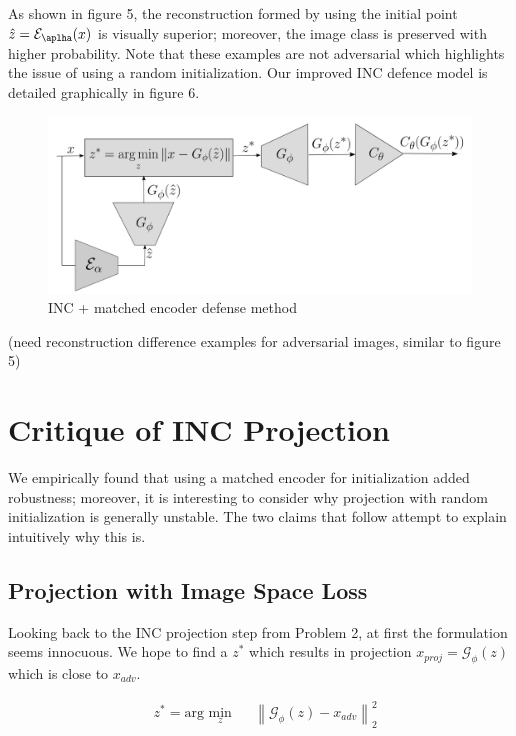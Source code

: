 \documentclass[twoside]{article}
\theoremstyle{definition}
\newcommand{\norm}[2]{\left\lVert #1 \right\rVert_{#2}}
\begin{document}
As shown in figure 5, the reconstruction formed by using the initial point $\hat{z} = \mathcal{E}_{\aplha}(x) $ is visually superior; moreover, the image class is preserved with higher probability. Note that these examples are not adversarial which highlights the issue of using a random initialization. Our improved INC defence model is detailed graphically in figure 6. 

\begin{figure}[H]
\centering
\caption{INC + matched encoder defense method }
\includegraphics[scale=0.25]{INC++.png}
\end{figure}

(need reconstruction difference examples for adversarial images, similar to figure 5)

\section{Critique of INC Projection}
We empirically found that using a matched encoder for initialization added robustness; moreover, it is interesting to consider why projection with random initialization is generally unstable. The two claims that follow attempt to explain intuitively why this is.

\subsection{Projection with Image Space Loss}
Looking back to the INC projection step from Problem 2, at first the formulation seems innocuous. We hope to find a $z^*$ which results in projection $x_{proj} = \mathcal{G}_{\phi}(z)$ which is close to $x_{adv}$.

\begin{equation*}
\begin{aligned}
& z^* = \text{arg } \underset{z}{\text{min}}
& & \norm{\mathcal{G}_{\phi}(z)-x_{adv}}{2}^2 \\
\end{aligned}
\end{equation*}
\end{document}
